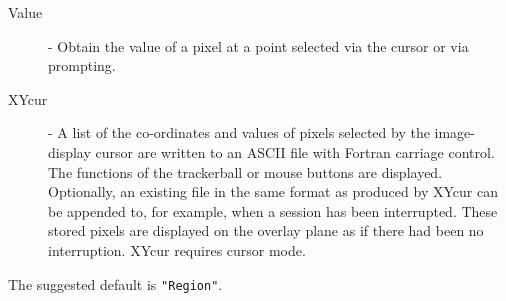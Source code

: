 {{{{\begin{description}
         \item [Value]  - Obtain the value of a pixel at a point selected
                          via the cursor or via prompting.
         \item [XYcur]  - A list of the co-ordinates and values of pixels
                          selected by the image-display cursor are
                          written to an ASCII file with Fortran carriage
                          control. The functions of the trackerball or
                          mouse buttons are displayed.  Optionally, an
                          existing file in the same format as produced
                          by XYcur can be appended to, for example, when
                          a session has been interrupted.  These stored
                          pixels are displayed on the overlay plane as
                          if there had been no interruption.  XYcur
                          requires cursor mode.
         \end{description}
         The suggested default is {\tt "Region"}.

}}}}
